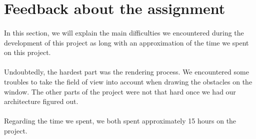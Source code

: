 \documentclass[a4paper, 11pt, oneside]{article}
\begin{document}

\section{Feedback about the assignment}
\paragraph{}In this section, we will explain the main difficulties we encountered during the development of this project as long with an approximation of the time we spent on this project.
\paragraph{}Undoubtedly, the hardest part was the rendering process. We encountered some troubles to take the field of view into account when drawing the obstacles on the window. The other parts of the project were not that hard once we had our architecture figured out.
\paragraph{}Regarding the time we spent, we both spent approximately 15 hours on the project.

\end{document}
